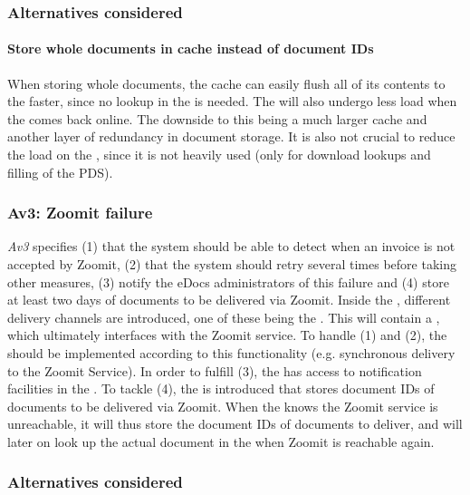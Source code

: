 \subsubsection*{Alternatives considered}
\paragraph{Store whole documents in cache instead of document IDs} When storing whole documents, the cache can easily flush all of its contents to the  faster, since no lookup in the  is needed. The  will also undergo less load when the  comes back online. The downside to this being a much larger cache and another layer of redundancy in document storage. It is also not crucial to reduce 
the load on the , since it is not heavily used (only for download lookups and filling of the PDS).

\subsubsection{Av3: Zoomit failure}\label{march:av3}
\emph{Av3} specifies (1) that the system should be able to detect when an invoice is not accepted by Zoomit, (2) that the system should retry several times before taking other measures, (3) notify the eDocs administrators of this failure and (4) store at least two days of documents to be delivered via Zoomit. Inside the , different delivery channels are introduced, one of these being the . This  will contain a , which ultimately interfaces with the Zoomit service. To handle (1) and (2), the  should be implemented according to this functionality (e.g. synchronous delivery to the Zoomit Service). In order to fulfill (3), the  has access to notification facilities in the . To tackle (4), the  is introduced that stores document IDs of documents to be delivered via Zoomit. When the  knows the Zoomit service is unreachable, it will thus store the document IDs of documents to deliver, and will later on look up the actual document in the  when Zoomit is reachable again.

\subsubsection*{Alternatives considered}
